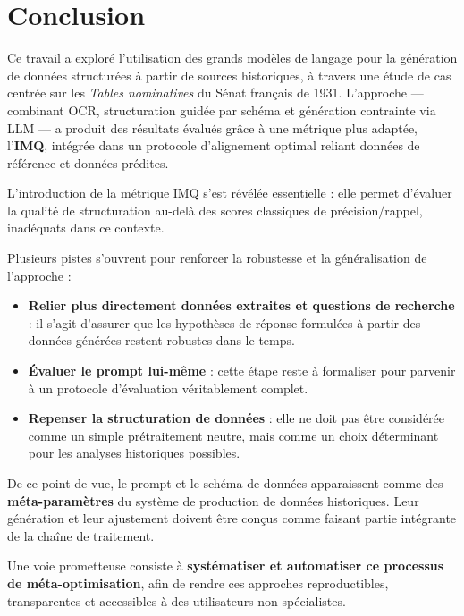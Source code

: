 \section{Conclusion}

Ce travail a exploré l’utilisation des grands modèles de langage pour la génération de données structurées à partir de sources historiques, à travers une étude de cas centrée sur les \emph{Tables nominatives} du Sénat français de 1931. L’approche — combinant OCR, structuration guidée par schéma et génération contrainte via LLM — a produit des résultats évalués grâce à une métrique plus adaptée, l’\textbf{IMQ}, intégrée dans un protocole d’alignement optimal reliant données de référence et données prédites.

L’introduction de la métrique IMQ s’est révélée essentielle : elle permet d’évaluer la qualité de structuration au-delà des scores classiques de précision/rappel, inadéquats dans ce contexte.

Plusieurs pistes s’ouvrent pour renforcer la robustesse et la généralisation de l’approche :

\begin{itemize}
\item \textbf{Relier plus directement données extraites et questions de recherche} : il s’agit d’assurer que les hypothèses de réponse formulées à partir des données générées restent robustes dans le temps.
\item \textbf{Évaluer le prompt lui-même} : cette étape reste à formaliser pour parvenir à un protocole d’évaluation véritablement complet.
\item \textbf{Repenser la structuration de données} : elle ne doit pas être considérée comme un simple prétraitement neutre, mais comme un choix déterminant pour les analyses historiques possibles.

\end{itemize}
De ce point de vue, le prompt et le schéma de données apparaissent comme des \textbf{méta-paramètres} du système de production de données historiques. Leur génération et leur ajustement doivent être conçus comme faisant partie intégrante de la chaîne de traitement.

Une voie prometteuse consiste à \textbf{systématiser et automatiser ce processus de méta-optimisation}, afin de rendre ces approches reproductibles, transparentes et accessibles à des utilisateurs non spécialistes.

